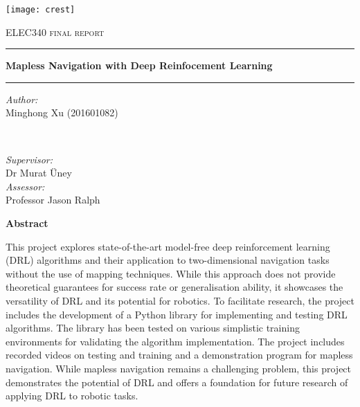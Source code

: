 \begin{titlepage}
\center %

\texttt{[image: crest]}

\vspace{6mm}

\textsc{\Large ELEC340 final report}

\vspace{6mm}

\rule[6mm]{\linewidth}{0.75mm}
{\Large\bfseries
Mapless Navigation with Deep Reinfocement Learning
}\rule[-3mm]{\linewidth}{0.75mm}

\vspace{5mm}

\begin{minipage}{0.4\textwidth}
   \begin{flushleft}
      \emph{Author:} \\
      Minghong Xu (201601082)
   \end{flushleft}
\end{minipage}
~
\begin{minipage}{0.4\textwidth}
   \begin{flushright}
      \emph{Supervisor:} \\
      Dr Murat {\"U}ney
      \\[1.2em]
      \emph{Assessor:} \\
      Professor Jason Ralph
   \end{flushright}
\end{minipage}

\vspace{3mm}

\textbf{Abstract}
\begin{spacing}{0.95}
\parbox{0.83\textwidth}{
This project explores state-of-the-art model-free deep reinforcement learning (DRL) algorithms and their application to two-dimensional navigation tasks without the use of mapping techniques. While this approach does not provide theoretical guarantees for success rate or generalisation ability, it showcases the versatility of DRL and its potential for robotics. To facilitate research, the project includes the development of a Python library for implementing and testing DRL algorithms. The library has been tested on various simplistic training environments for validating the algorithm implementation. The project includes recorded videos on testing and training and a demonstration program for mapless navigation. While mapless navigation remains a challenging problem, this project demonstrates the potential of DRL and offers a foundation for future research of applying DRL to robotic tasks.
}
\end{spacing}


\end{titlepage}
